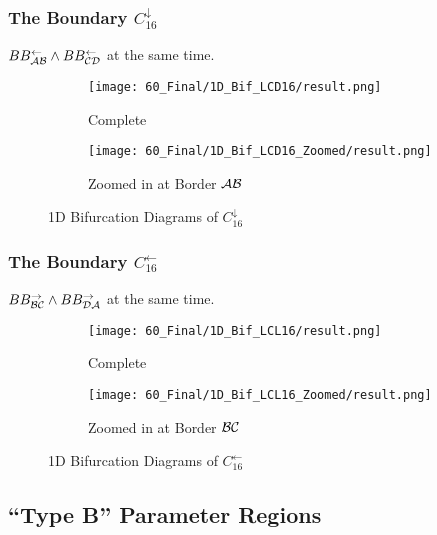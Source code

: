 \subsubsection{The Boundary $C_{16}^\downarrow$}

$BB_{\mathcal{A}\mathcal{B}}^\leftarrow \land BB_{\mathcal{C}\mathcal{D}}^\leftarrow$ at the same time.

\begin{figure}
    \centering
    \begin{subfigure}{0.4\textwidth}
        \centering
        \texttt{[image: 60\_Final/1D\_Bif\_LCD16/result.png]}
        \caption{Complete}
        \label{fig:final.bifurcation.C.down}
    \end{subfigure}
    \begin{subfigure}{0.4\textwidth}
        \centering
        \texttt{[image: 60\_Final/1D\_Bif\_LCD16\_Zoomed/result.png]}
        \caption{Zoomed in at Border $\mathcal{A}\mathcal{B}$}
        \label{fig:final.bifurcation.C.down.zoomed}
    \end{subfigure}
    \caption{1D Bifurcation Diagrams of $C_{16}^\downarrow$}
\end{figure}

\subsubsection{The Boundary $C_{16}^\leftarrow$}

$BB_{\mathcal{B}\mathcal{C}}^\rightarrow \land BB_{\mathcal{D}\mathcal{A}}^\rightarrow$ at the same time.

\begin{figure}
    \centering
    \begin{subfigure}{0.4\textwidth}
        \centering
        \texttt{[image: 60\_Final/1D\_Bif\_LCL16/result.png]}
        \caption{Complete}
        \label{fig:final.bifurcation.C.left}
    \end{subfigure}
    \begin{subfigure}{0.4\textwidth}
        \centering
        \texttt{[image: 60\_Final/1D\_Bif\_LCL16\_Zoomed/result.png]}
        \caption{Zoomed in at Border $\mathcal{B}\mathcal{C}$}
        \label{fig:final.bifurcation.C.left.zoomed}
    \end{subfigure}
    \caption{1D Bifurcation Diagrams of $C_{16}^\leftarrow$}
\end{figure}

\subsection{``Type B'' Parameter Regions}

